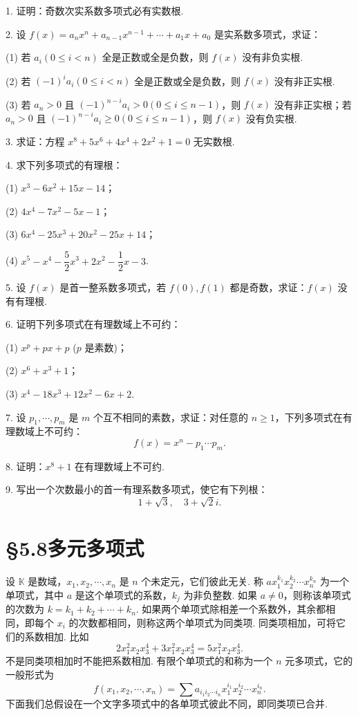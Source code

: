 \documentclass[UTF8,12pt,a4paper,fontset=fandol]{ctexart}
\begin{document}
1. 证明：奇数次实系数多项式必有实数根.

2. 设 $f(x)=a_nx^n+a_{n-1}x^{n-1}+\cdots+a_1x+a_0$ 是实系数多项式，求证：

(1) 若 $a_i(0\leq i<n)$ 全是正数或全是负数，则 $f(x)$ 没有非负实根.

(2) 若 $(-1)^ia_i(0\leq i<n)$ 全是正数或全是负数，则 $f(x)$ 没有非正实根.

(3) 若 $a_n>0$ 且 $(-1)^{n-i}a_i>0(0\leq i\leq n-1)$，则 $f(x)$ 没有非正实根；若 $a_n>0$ 且 $(-1)^{n-i}a_i\geq 0(0\leq i\leq n-1)$，则 $f(x)$ 没有负实根.

3. 求证：方程 $x^8+5x^6+4x^4+2x^2+1=0$ 无实数根.

4. 求下列多项式的有理根：

(1) $x^3-6x^2+15x-14$；

(2) $4x^4-7x^2-5x-1$；

(3) $6x^4-25x^3+20x^2-25x+14$；

(4) $x^5-x^4-\dfrac52x^3+2x^2-\dfrac12x-3$.

5. 设 $f(x)$ 是首一整系数多项式，若 $f(0),f(1)$ 都是奇数，求证：$f(x)$ 没有有理根.

6. 证明下列多项式在有理数域上不可约：

(1) $x^p+px+p$ ($p$ 是素数)；

(2) $x^6+x^3+1$；

(3) $x^4-18x^3+12x^2-6x+2$.

7. 设 $p_1,\cdots,p_m$ 是 $m$ 个互不相同的素数，求证：对任意的 $n\geq 1$，下列多项式在有理数域上不可约：
\[
f(x)=x^n-p_1\cdots p_m.
\]

8. 证明：$x^8+1$ 在有理数域上不可约.

9. 写出一个次数最小的首一有理系数多项式，使它有下列根：
\[
1+\sqrt3,\quad 3+\sqrt{2}i.
\]

\section*{§5.8\quad 多元多项式}

设 $\mathbb{K}$ 是数域，$x_1,x_2,\cdots,x_n$ 是 $n$ 个未定元，它们彼此无关. 称 $ax_1^{k_1}x_2^{k_2}\cdots x_n^{k_n}$ 为一个单项式，其中 $a$ 是这个单项式的系数，$k_j$ 为非负整数. 如果 $a\neq 0$，则称该单项式的次数为 $k=k_1+k_2+\cdots+k_n$. 如果两个单项式除相差一个系数外，其余都相同，即每个 $x_i$ 的次数都相同，则称这两个单项式为同类项. 同类项相加，可将它们的系数相加. 比如
\[
2x_1^2x_2x_3^4+3x_1^2x_2x_3^4=5x_1^2x_2x_3^4.
\]
不是同类项相加时不能把系数相加. 有限个单项式的和称为一个 $n$ 元多项式，它的一般形式为
\[
f(x_1,x_2,\cdots,x_n)=\sum a_{i_1i_2\cdots i_n}x_1^{i_1}x_2^{i_2}\cdots x_n^{i_n}.
\]
下面我们总假设在一个文字多项式中的各单项式彼此不同，即同类项已合并.
\end{document}
